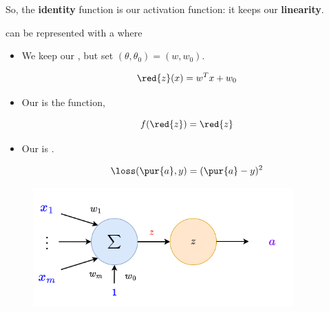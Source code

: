         
        So, the \textbf{identity} function is our activation function: it keeps our \textbf{linearity}.\\
        
        \begin{concept}
             can be represented with a  where
            
            \begin{itemize}
                \item We keep our , but set $(\theta, \theta_0) = (w, w_0)$.
                
                \begin{equation*}
                    \red{z}(x) = w^Tx+w_0
                \end{equation*}
                
                \item Our  is the  function, 
                
                \begin{equation*}
                    f(\red{z}) = \red{z}
                \end{equation*}
                
                \item Our  is .
                
                \begin{equation*}
                    \loss(\pur{a},y) = (\pur{a}-y)^2
                \end{equation*}
                
            \end{itemize}
        \end{concept}
        
        \begin{figure}[H]
            \centering
            \includegraphics[width=100mm,scale=0.4]{images/nn_images/linear_reg.png}
        \end{figure}
    
